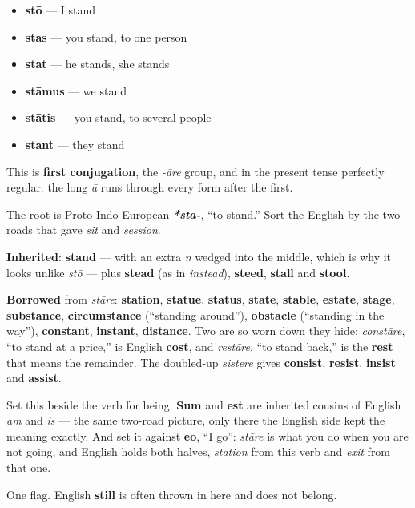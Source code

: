 \begin{itemize}
\raggedright
  \item \textbf{stō} — I stand
  \item \textbf{stās} — you stand, to one person
  \item \textbf{stat} — he stands, she stands
  \item \textbf{stāmus} — we stand
  \item \textbf{stātis} — you stand, to several people
  \item \textbf{stant} — they stand
\end{itemize}

This is \textbf{first conjugation}, the \emph{-āre} group, and in the present tense perfectly regular: the long \emph{ā} runs through every form after the first.

\begin{cousinweb}
The root is Proto-Indo-European \emph{\textbf{*sta-}}, \textquotedblleft{}to stand.\textquotedblright{} Sort the English by the two roads that gave \emph{sit} and \emph{session}.

\textbf{Inherited}: \textbf{stand} — with an extra \emph{n} wedged into the middle, which is why it looks unlike \emph{stō} — plus \textbf{stead} (as in \emph{instead}), \textbf{steed}, \textbf{stall} and \textbf{stool}.

\textbf{Borrowed} from \emph{stāre}: \textbf{station}, \textbf{statue}, \textbf{status}, \textbf{state}, \textbf{stable}, \textbf{estate}, \textbf{stage}, \textbf{substance}, \textbf{circumstance} (\textquotedblleft{}standing around\textquotedblright{}), \textbf{obstacle} (\textquotedblleft{}standing in the way\textquotedblright{}), \textbf{constant}, \textbf{instant}, \textbf{distance}. Two are so worn down they hide: \emph{constāre}, \textquotedblleft{}to stand at a price,\textquotedblright{} is English \textbf{cost}, and \emph{restāre}, \textquotedblleft{}to stand back,\textquotedblright{} is the \textbf{rest} that means the remainder. The doubled-up \emph{sistere} gives \textbf{consist}, \textbf{resist}, \textbf{insist} and \textbf{assist}.

Set this beside the verb for being. \textbf{Sum} and \textbf{est} are inherited cousins of English \emph{am} and \emph{is} — the same two-road picture, only there the English side kept the meaning exactly. And set it against \textbf{eō}, \textquotedblleft{}I go\textquotedblright{}: \emph{stāre} is what you do when you are not going, and English holds both halves, \emph{station} from this verb and \emph{exit} from that one.

One flag. English \textbf{still} is often thrown in here and does not belong.
\end{cousinweb}

